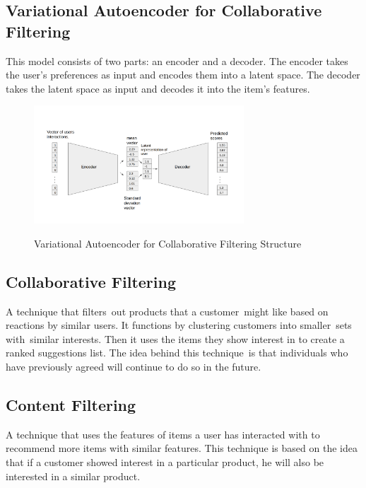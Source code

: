 \subsection{Variational Autoencoder for Collaborative Filtering}
This model consists of two parts: an encoder and a decoder. The encoder takes the user's preferences as input and encodes them into a latent space. The decoder takes the latent space as input and decodes it into the item's features.
\begin{figure}[H]
    \centering
    \includegraphics[width=0.7\textwidth]{assets/variational-autoencoder.png}
    \caption{Variational Autoencoder for Collaborative Filtering Structure}
    \label{fig:variational-autoencoder-for-collaborative-filtering}
    \cite{NvidiaRecSys}
\end{figure}
\subsection{Collaborative Filtering}
A technique that filters out products that a customer might like based on reactions by similar users. It functions by clustering customers into smaller sets with similar interests. Then it uses the items they show interest in to create a ranked suggestions list. The idea behind this technique is that individuals who have previously agreed will continue to do so in the future.
\subsection{Content Filtering}
A technique that uses the features of items a user has interacted with to recommend more items with similar features. This technique is based on the idea that if a customer showed interest in a particular product, he will also be interested in a similar product. \\



